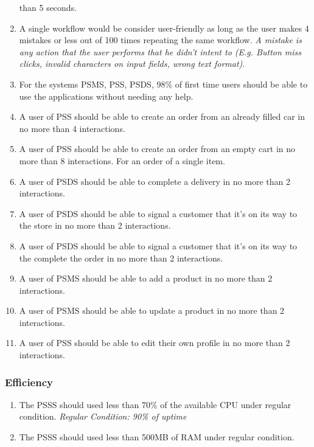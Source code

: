 \begin{enumerate}[label=USE-\arabic*]
    than 5 seconds.
    \item A single workflow would be consider user-friendly as long as the 
    user makes 4 mistakes or less out of 100 times repeating the same workflow. 
    \textit{A mistake is any action that the user performs that he didn’t 
    intent to (E.g. Button miss clicks, invalid characters on input fields, 
    wrong text format)}.
    \item For the systems PSMS, PSS, PSDS, 98\% of first time users should be 
    able to use the applications without needing any help.
    \item A user of PSS should be able to create an order from an already 
    filled car in no more than 4 interactions.
    \item A user of PSS should be able to create an order from an empty cart 
    in no more than 8 interactions. For an order of a single item.
    \item A user of PSDS should be able to complete a delivery in no more 
    than 2 interactions.
    \item A user of PSDS should be able to signal a customer that it’s on its 
    way to the store in no more than 2 interactions.
    \item A user of PSDS should be able to signal a customer that it’s on its
    way to the complete the order in no more than 2 interactions.
    \item A user of PSMS should be able to add a product in no more 
    than 2 interactions.
    \item A user of PSMS should be able to update a product in no more 
    than 2 interactions.
    \item A user of PSS should be able to edit their own profile in no more 
    than 2 interactions.
\end{enumerate}
\pagebreak
\subsubsection{Efficiency}
\begin{enumerate}[label=EFF-\arabic*]
    \item The PSSS should used less than 70\% of the available CPU under 
    regular condition. \textit{Regular Condition: 90\% of uptime}
    \item The PSSS should used less than 500MB of RAM under regular condition.
\end{enumerate}

